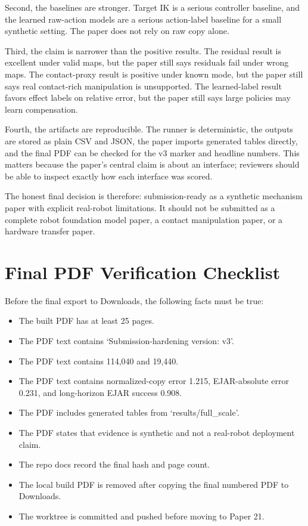 \documentclass{article}
\begin{document}
Second, the baselines are stronger. Target IK is a serious controller baseline, and the learned raw-action models are a serious action-label baseline for a small synthetic setting. The paper does not rely on raw copy alone.

Third, the claim is narrower than the positive results. The residual result is excellent under valid maps, but the paper still says residuals fail under wrong maps. The contact-proxy result is positive under known mode, but the paper still says real contact-rich manipulation is unsupported. The learned-label result favors effect labels on relative error, but the paper still says large policies may learn compensation.

Fourth, the artifacts are reproducible. The runner is deterministic, the outputs are stored as plain CSV and JSON, the paper imports generated tables directly, and the final PDF can be checked for the v3 marker and headline numbers. This matters because the paper's central claim is about an interface; reviewers should be able to inspect exactly how each interface was scored.

The honest final decision is therefore: submission-ready as a synthetic mechanism paper with explicit real-robot limitations. It should not be submitted as a complete robot foundation model paper, a contact manipulation paper, or a hardware transfer paper.

\section{Final PDF Verification Checklist}

Before the final export to Downloads, the following facts must be true:
\begin{itemize}
\item The built PDF has at least 25 pages.
\item The PDF text contains `Submission-hardening version: v3'.
\item The PDF text contains 114,040 and 19,440.
\item The PDF text contains normalized-copy error 1.215, EJAR-absolute error 0.231, and long-horizon EJAR success 0.908.
\item The PDF includes generated tables from `results/full\_scale'.
\item The PDF states that evidence is synthetic and not a real-robot deployment claim.
\item The repo docs record the final hash and page count.
\item The local build PDF is removed after copying the final numbered PDF to Downloads.
\item The worktree is committed and pushed before moving to Paper 21.
\end{itemize}
\end{document}
